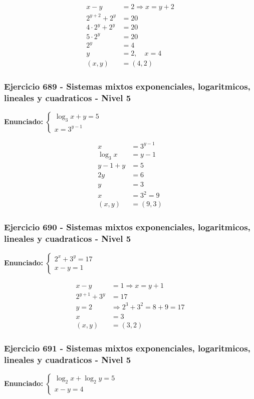 \documentclass[12pt,a4paper]{article}
\begin{document}
\[
\begin{aligned}
x-y&=2\Rightarrow x=y+2\\
2^{y+2}+2^y&=20\\
4\cdot2^y+2^y&=20\\
5\cdot2^y&=20\\
2^y&=4\\
y&=2,
\quad x=4\\
(x,y)&=\boxed{(4,2)}
\end{aligned}
\]


\subsubsection*{Ejercicio 689 - Sistemas mixtos exponenciales, logaritmicos, lineales y cuadraticos - Nivel 5}
\textbf{Enunciado:} \(\begin{cases}\log_3x+y=5\\ x=3^{y-1}\end{cases}\)

\[
\begin{aligned}
x&=3^{y-1}\\
\log_3x&=y-1\\
y-1+y&=5\\
2y&=6\\
y&=3\\
x&=3^2=9\\
(x,y)&=\boxed{(9,3)}
\end{aligned}
\]


\subsubsection*{Ejercicio 690 - Sistemas mixtos exponenciales, logaritmicos, lineales y cuadraticos - Nivel 5}
\textbf{Enunciado:} \(\begin{cases}2^x+3^y=17\\ x-y=1\end{cases}\)

\[
\begin{aligned}
x-y&=1\Rightarrow x=y+1\\
2^{y+1}+3^y&=17\\
y=2&\Rightarrow 2^3+3^2=8+9=17\\
x&=3\\
(x,y)&=\boxed{(3,2)}
\end{aligned}
\]


\subsubsection*{Ejercicio 691 - Sistemas mixtos exponenciales, logaritmicos, lineales y cuadraticos - Nivel 5}
\textbf{Enunciado:} \(\begin{cases}\log_2x+\log_2y=5\\ x-y=4\end{cases}\)
\end{document}
